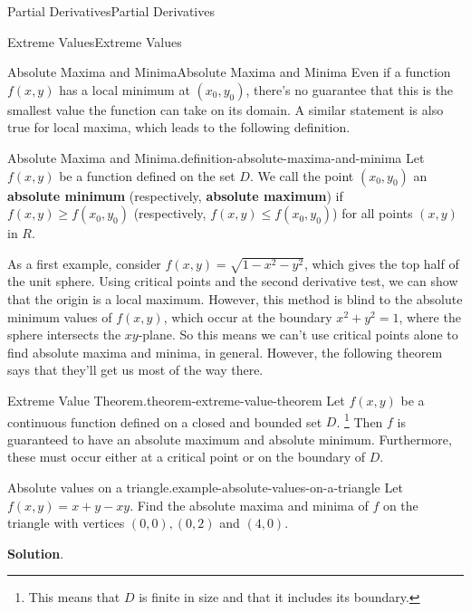 \documentclass[10pt,]{book}
\newcommand{\terminology}[1]{\textbf{#1}}
\numberwithin{equation}{section}
\begin{document}
\begin{chapterptx}{Partial Derivatives}{}{Partial Derivatives}{}{}
\begin{sectionptx}{Extreme Values}{}{Extreme Values}{}{}
%
\begin{subsectionptx}{Absolute Maxima and Minima}{}{Absolute Maxima and Minima}{}{}\label{subsection-absolute-maxima-and-minima}
\hypertarget{p-1211}{}%
Even if a function \(f(x,y)\) has a local minimum at \((x_{0},y_{0})\), there's no guarantee that this is the smallest value the function can take on its domain. A similar statement is also true for local maxima, which leads to the following definition.%
\begin{definition}{Absolute Maxima and Minima.}{definition-absolute-maxima-and-minima}%
\hypertarget{p-1212}{}%
Let \(f(x,y)\) be a function defined on the set \(D\). We call the point \((x_{0},y_{0})\) an \terminology{absolute minimum} (respectively, \terminology{absolute maximum}) if \(f(x,y)\geq f(x_{0},y_{0})\) (respectively, \(f(x,y)\leq f(x_{0},y_{0})\)) for all points \((x,y)\) in \(R\).%
\end{definition}
\hypertarget{p-1213}{}%
As a first example, consider \(f(x,y) = \sqrt{1 - x^{2} - y^{2}}\), which gives the top half of the unit sphere. Using critical points and the second derivative test, we can show that the origin is a local maximum. However, this method is blind to the absolute minimum values of \(f(x,y)\), which occur at the boundary \(x^{2} + y^{2} = 1\), where the sphere intersects the \(xy\)-plane. So this means we can't use critical points alone to find absolute maxima and minima, in general. However, the following theorem says that they'll get us most of the way there.%
\begin{theorem}{Extreme Value Theorem.}{}{theorem-extreme-value-theorem}%
\hypertarget{p-1214}{}%
Let \(f(x,y)\) be a continuous function defined on a closed and bounded set \(D\). \footnote{This means that \(D\) is finite in size and that it includes its boundary.\label{fn-7}} Then \(f\) is guaranteed to have an absolute maximum and absolute minimum. Furthermore, these must occur either at a critical point or on the boundary of \(D\).%
\end{theorem}
\begin{example}{Absolute values on a triangle.}{example-absolute-values-on-a-triangle}%
\hypertarget{p-1215}{}%
Let \(f(x,y) = x + y - xy\). Find the absolute maxima and minima of \(f\) on the triangle with vertices \((0,0), (0,2)\) and \((4,0)\).%
\par\smallskip%
\noindent\textbf{Solution}.\hypertarget{solution-191}{}\quad%
\hypertarget{p-1216}{}%

\end{example}
\end{subsectionptx}
\end{sectionptx}
\end{chapterptx}
\end{document}

